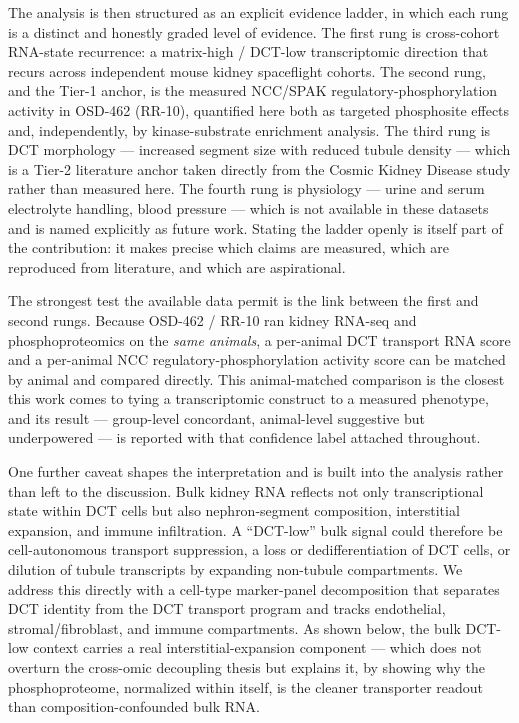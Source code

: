 \documentclass[11pt]{article}
\begin{document}
The analysis is then structured as an explicit evidence ladder, in which each rung is a distinct and honestly graded level of evidence. The first rung is cross-cohort RNA-state recurrence: a matrix-high / DCT-low transcriptomic direction that recurs across independent mouse kidney spaceflight cohorts. The second rung, and the Tier-1 anchor, is the measured NCC/SPAK regulatory-phosphorylation activity in OSD-462 (RR-10), quantified here both as targeted phosphosite effects and, independently, by kinase-substrate enrichment analysis. The third rung is DCT morphology --- increased segment size with reduced tubule density --- which is a Tier-2 literature anchor taken directly from the Cosmic Kidney Disease study rather than measured here. The fourth rung is physiology --- urine and serum electrolyte handling, blood pressure --- which is not available in these datasets and is named explicitly as future work. Stating the ladder openly is itself part of the contribution: it makes precise which claims are measured, which are reproduced from literature, and which are aspirational.

The strongest test the available data permit is the link between the first and second rungs. Because OSD-462 / RR-10 ran kidney RNA-seq and phosphoproteomics on the \emph{same animals}, a per-animal DCT transport RNA score and a per-animal NCC regulatory-phosphorylation activity score can be matched by animal and compared directly. This animal-matched comparison is the closest this work comes to tying a transcriptomic construct to a measured phenotype, and its result --- group-level concordant, animal-level suggestive but underpowered --- is reported with that confidence label attached throughout.

One further caveat shapes the interpretation and is built into the analysis rather than left to the discussion. Bulk kidney RNA reflects not only transcriptional state within DCT cells but also nephron-segment composition, interstitial expansion, and immune infiltration. A ``DCT-low'' bulk signal could therefore be cell-autonomous transport suppression, a loss or dedifferentiation of DCT cells, or dilution of tubule transcripts by expanding non-tubule compartments. We address this directly with a cell-type marker-panel decomposition that separates DCT identity from the DCT transport program and tracks endothelial, stromal/fibroblast, and immune compartments. As shown below, the bulk DCT-low context carries a real interstitial-expansion component --- which does not overturn the cross-omic decoupling thesis but explains it, by showing why the phosphoproteome, normalized within itself, is the cleaner transporter readout than composition-confounded bulk RNA.
\end{document}
